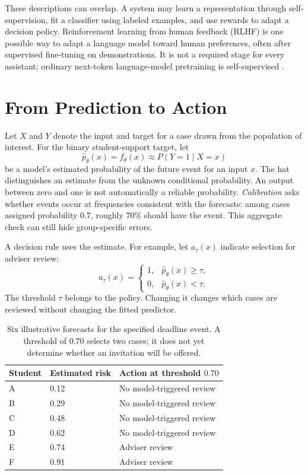 These descriptions can overlap. A system may learn a representation through self-supervision, fit a classifier using labeled examples, and use rewards to adapt a decision policy. Reinforcement learning from human feedback (RLHF) is one possible way to adapt a language model toward human preferences, often after supervised fine-tuning on demonstrations. It is not a required stage for every assistant; ordinary next-token language-model pretraining is self-supervised \citep{ouyang2022}.

\section{From Prediction to Action}

Let $X$ and $Y$ denote the input and target for a case drawn from the population of interest. For the binary student-support target, let
\[
\hat p_\theta(x)=f_\theta(x) \approx P(Y=1\mid X=x)
\]
be a model's estimated probability of the future event for an input $x$. The hat distinguishes an estimate from the unknown conditional probability. An output between zero and one is not automatically a reliable probability. \emph{Calibration} asks whether events occur at frequencies consistent with the forecasts: among cases assigned probability $0.7$, roughly $70\%$ should have the event. This aggregate check can still hide group-specific errors.

A decision rule uses the estimate. For example, let $a_\tau(x)$ indicate selection for adviser review:
\[
a_\tau(x)=
\begin{cases}
1, & \hat p_\theta(x)\geq\tau,\\
0, & \hat p_\theta(x)<\tau.
\end{cases}
\]
The threshold $\tau$ belongs to the policy. Changing it changes which cases are reviewed without changing the fitted predictor.

\begin{table}[t]
\centering
\small
\setlength{\tabcolsep}{4pt}
\begin{tabular}{L{1.76cm}L{2.02cm}L{6.16cm}}
\toprule
Student & Estimated risk & Action at threshold $0.70$ \\
\midrule
A & 0.12 & No model-triggered review \\
B & 0.29 & No model-triggered review \\
C & 0.48 & No model-triggered review \\
D & 0.62 & No model-triggered review \\
E & 0.74 & Adviser review \\
F & 0.91 & Adviser review \\
\bottomrule
\end{tabular}
\caption{Six illustrative forecasts for the specified deadline event. A threshold of $0.70$ selects two cases; it does not yet determine whether an invitation will be offered.}
\label{tab:threshold-worked-example}
\end{table}

